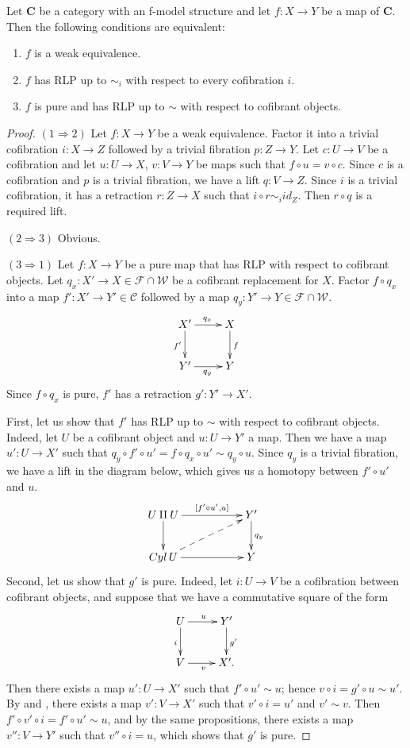\documentclass{amsart}
\theoremstyle{definition}
\newcommand{\we}{\mathcal{W}}
\newcommand{\fib}{\mathcal{F}}
\newcommand{\cof}{\mathcal{C}}
\newcommand{\cat}[1]{\mathbf{#1}}
\newcommand{\C}{\cat{C}}
\begin{document}
\begin{prop}[min-we]
Let $\C$ be a category with an f-model structure and let $f : X \to Y$ be a map of $\C$.
Then the following conditions are equivalent:
\begin{enumerate}
\item $f$ is a weak equivalence.
\item $f$ has RLP up to $\sim_i$ with respect to every cofibration $i$.
\item $f$ is pure and has RLP up to $\sim$ with respect to cofibrant objects.
\end{enumerate}
\end{prop}
\begin{proof}
$(1 \Rightarrow 2)$
Let $f : X \to Y$ be a weak equivalence.
Factor it into a trivial cofibration $i : X \to Z$ followed by a trivial fibration $p : Z \to Y$.
Let $c : U \to V$ be a cofibration and let $u : U \to X$, $v : V \to Y$ be maps such that $f \circ u = v \circ c$.
Since $c$ is a cofibration and $p$ is a trivial fibration, we have a lift $q : V \to Z$.
Since $i$ is a trivial cofibration, it has a retraction $r : Z \to X$ such that $i \circ r \sim_i id_Z$.
Then $r \circ q$ is a required lift.

$(2 \Rightarrow 3)$ Obvious.

$(3 \Rightarrow 1)$
Let $f : X \to Y$ be a pure map that has RLP with respect to cofibrant objects.
Let $q_x : X' \to X \in \fib \cap \we$ be a cofibrant replacement for $X$.
Factor $f \circ q_x$ into a map $f' : X' \to Y' \in \cof$ followed by a map $q_y : Y' \to Y \in \fib \cap \we$.
\[ \xymatrix{ X' \ar[r]^{q_x} \ar[d]_{f'} & X \ar[d]^f \\
              Y' \ar[r]_{q_y}             & Y
            } \]
Since $f \circ q_x$ is pure, $f'$ has a retraction $g' : Y' \to X'$.

First, let us show that $f'$ has RLP up to $\sim$ with respect to cofibrant objects.
Indeed, let $U$ be a cofibrant object and $u : U \to Y'$ a map.
Then we have a map $u' : U \to X'$ such that $q_y \circ f' \circ u' = f \circ q_x \circ u' \sim q_y \circ u$.
Since $q_y$ is a trivial fibration, we have a lift in the diagram below, which gives us a homotopy between $f' \circ u'$ and $u$.
\[ \xymatrix{ U \amalg U \ar[rr]^-{[f' \circ u', u]} \ar[d] & & Y' \ar[d]^{q_y} \\
              Cyl\,U     \ar[rr] \ar@{-->}[urr]             & & Y
            } \]
Second, let us show that $g'$ is pure.
Indeed, let $i : U \to V$ be a cofibration between cofibrant objects, and suppose that we have a commutative square of the form
\[ \xymatrix{ U \ar[r]^u \ar[d]_i & Y' \ar[d]^{g'} \\
              V \ar[r]_v          & X'.
            } \]
Then there exists a map $u' : U \to X'$ such that $f' \circ u' \sim u$; hence $v \circ i = g' \circ u \sim u'$.
By  and , there exists a map $v' : V \to X'$ such that $v' \circ i = u'$ and $v' \sim v$.
Then $f' \circ v' \circ i = f' \circ u' \sim u$, and by the same propositions, there exists a map $v'' : V \to Y'$ such that $v'' \circ i = u$, which shows that $g'$ is pure.


\end{proof}
\end{document}
